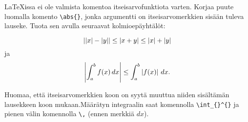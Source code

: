     \begin{harj}
        \LaTeX issa ei ole valmista komentoa itseisarvofunktiota varten. Korjaa puute luomalla komento \lstinline-\abs{}-, jonka argumentti on itseisarvomerkkien sisään tuleva lauseke. Tuota sen avulla seuraavat kolmioepäyhtälöt:
        \begin{sample}
            \[
                \left|\left|x\right|-\left|y\right|\right|\leq \left|x+y\right|\leq\left|x\right|+\left|y\right|
            \]
            ja
            \[
                \left|\int_a^b f(x)\,dx\right| \leq\int_a^b\left|f(x)\right|\, dx.
            \]
        \end{sample}
        Huomaa, että itseisarvomerkkien koon on syytä muuttua niiden sisältämän lausekkeen koon mukaan.\vaihto Määrätyn integraalin saat komennolla \lstinline-\int_{}^{}- ja pienen välin komennolla \lstinline-\,- (ennen merkkiä \(dx\)).
    \end{harj}
